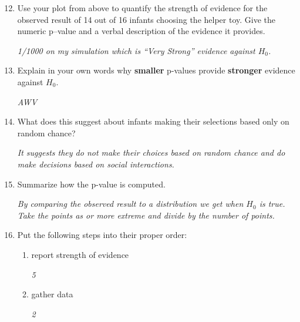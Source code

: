 \begin{enumerate}
  \setcounter{enumi}{11}

    \item  Use your plot from above to quantify the strength of
      evidence for the observed result 
      of 14 out of 16 infants choosing the helper toy. Give the
      numeric p--value  and a verbal description of the evidence it provides.
\begin{students}
  \vspace{1.5cm}
\end{students}

\begin{key}
{\it  1/1000 on my simulation which is ``Very Strong'' evidence
  against $H_0$.}
\end{key}

\item Explain in your own words why {\bf smaller} p-values provide
  {\bf stronger}   evidence against $H_0$.
\begin{students}
  \vspace{2cm}
\end{students}

\begin{key}
{\it AWV}
\end{key}

\item  What does this suggest about infants making their
      selections based only on random chance?
\begin{students}
  \vspace{2cm}
\end{students}

\begin{key}
{\it It suggests they do not make their choices based on random
 chance and do make decisions based on social interactions. }
\end{key}
\item Summarize how the p-value is computed.
\begin{students}
  \vspace{2cm}
\end{students}

\begin{key}
{\it By comparing the observed result to a distribution we get when
  $H_0$ is true. Take the points as or more extreme and divide by the
  number of points.}
\end{key}

\item  Put the following steps into their proper order:
 \begin{enumerate}
      \item  report strength of evidence 
\begin{key}
          {\it 5}
\end{key}
      \item  gather data 
\begin{key}
        {\it  2}
\end{key}


\end{enumerate}
\end{enumerate}
